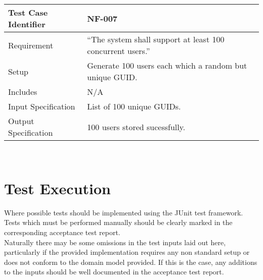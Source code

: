 \documentclass{l3deliverable}
\begin{document}
\begin{tabular}{lp{10cm}}
\hline 
\textbf{Test Case Identifier} & NF-007\tabularnewline
\hline 
\hline 
Requirement & ``The system shall support at least 100 concurrent users.'' \tabularnewline
\hline 
Setup & Generate 100 users each which a random but unique GUID. \tabularnewline
\hline 
Includes & N/A \tabularnewline
\hline 
Input Specification &  List of 100 unique GUIDs. \tabularnewline
\hline 
Output Specification & 100 users stored sucessfully. \tabularnewline
\hline 
\end{tabular}\\

\section{Test Execution}
Where possible tests  should be implemented using the JUnit test framework. Tests which must be performed manually should be clearly marked in the corresponding 
acceptance test report.\\
Naturally there may be some omissions in the test inputs laid out here, particularly if the provided implementation requires any non standard setup or does not conform to the domain model provided. If this is the case, any additions to the inputs should be well documented in the acceptance test report. 
\end{document}
